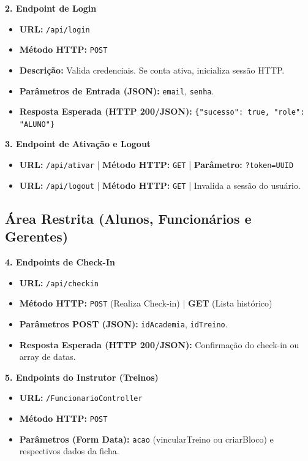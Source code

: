 \documentclass[12pt, a4paper]{article}
\begin{document}
\vspace{0.3cm}
\noindent\textbf{2. Endpoint de Login}
\begin{itemize}
    \item \textbf{URL:} \texttt{/api/login}
    \item \textbf{Método HTTP:} \texttt{POST}
    \item \textbf{Descrição:} Valida credenciais. Se conta ativa, inicializa sessão HTTP.
    \item \textbf{Parâmetros de Entrada (JSON):} \texttt{email}, \texttt{senha}.
    \item \textbf{Resposta Esperada (HTTP 200/JSON):} \texttt{\{"sucesso": true, "role": "ALUNO"\}}
\end{itemize}

\vspace{0.3cm}
\noindent\textbf{3. Endpoint de Ativação e Logout}
\begin{itemize}
    \item \textbf{URL:} \texttt{/api/ativar} | \textbf{Método HTTP:} \texttt{GET} | \textbf{Parâmetro:} \texttt{?token=UUID}
    \item \textbf{URL:} \texttt{/api/logout} | \textbf{Método HTTP:} \texttt{GET} | Invalida a sessão do usuário.
\end{itemize}

\subsection{Área Restrita (Alunos, Funcionários e Gerentes)}

\noindent\textbf{4. Endpoints de Check-In}
\begin{itemize}
    \item \textbf{URL:} \texttt{/api/checkin}
    \item \textbf{Método HTTP:} \texttt{POST} (Realiza Check-in) | \textbf{GET} (Lista histórico)
    \item \textbf{Parâmetros POST (JSON):} \texttt{idAcademia}, \texttt{idTreino}.
    \item \textbf{Resposta Esperada (HTTP 200/JSON):} Confirmação do check-in ou array de datas.
\end{itemize}

\vspace{0.3cm}
\noindent\textbf{5. Endpoints do Instrutor (Treinos)}
\begin{itemize}
    \item \textbf{URL:} \texttt{/FuncionarioController}
    \item \textbf{Método HTTP:} \texttt{POST}
    \item \textbf{Parâmetros (Form Data):} \texttt{acao} (vincularTreino ou criarBloco) e respectivos dados da ficha.
\end{itemize}
\end{document}
